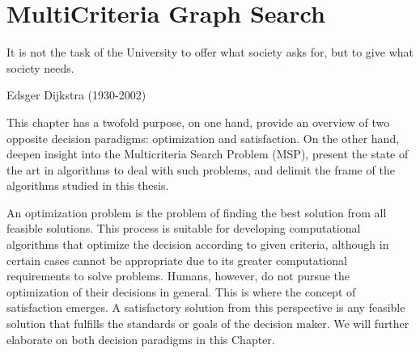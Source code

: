 %
%
%
%
%
%

\chapter{MultiCriteria Graph Search}
\label{chapMultiObjAlg}

%
\begin{FraseCelebre}
\begin{Frase}
It is not the task of the University to offer what society asks for, but to give what society needs.	
\end{Frase}
\begin{Fuente}
Edsger Dijkstra (1930-2002)
\end{Fuente}
\end{FraseCelebre}

This chapter has a twofold purpose, on one hand, provide an overview of two opposite decision paradigms: optimization and satisfaction. On the other hand, deepen insight into the Multicriteria Search Problem (MSP), present the state of the art in algorithms to deal with such problems, and delimit the frame of the algorithms studied in this thesis.

An optimization problem is the problem of finding the best solution from all feasible solutions. This process is suitable for developing computational algorithms that optimize the decision according to given criteria, although in certain cases cannot be appropriate due to its greater computational requirements to solve problems. Humans, however, do not pursue the optimization of their decisions in general. This is where the concept of satisfaction emerges. A satisfactory solution from this perspective is any feasible solution that fulfills the standards or goals of the decision maker. We will further elaborate on both decision paradigms in this Chapter. 

